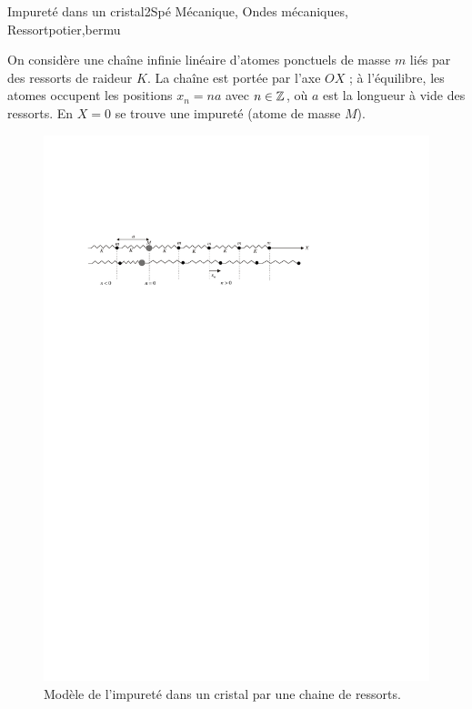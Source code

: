 
\begin{exercise}{Impureté dans un cristal}{2}{Spé}
{Mécanique, Ondes mécaniques, Ressort}{potier,bermu}

On considère une chaîne infinie linéaire d’atomes ponctuels de masse $m$ liés par des ressorts de raideur $K$. La chaîne est portée par l’axe $OX$ ; à l’équilibre, les atomes occupent les positions $x_n = n a$ avec $n\in\mathbb{Z}$, où $a$ est la longueur à vide des ressorts. En $X=0$ se trouve une impureté (atome de masse $M$).
\begin{figure}[H]
    \centering
    \includegraphics[width=\linewidth]{meca/ondes_meca/impurete.pdf}
    \vspace{-1.5em}
    \caption{Modèle de l'impureté dans un cristal par une chaine de ressorts.}
\end{figure}


\end{exercise}
